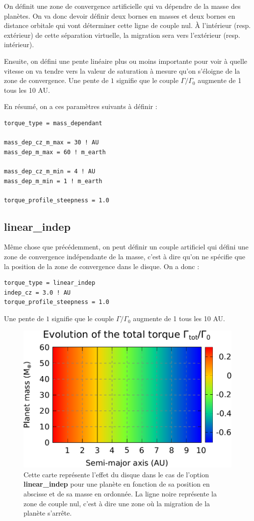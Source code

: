 On définit une zone de convergence artificielle qui va dépendre de la masse des planètes. On va donc devoir définir deux bornes en masses et deux bornes en distance orbitale qui vont déterminer cette ligne de couple nul. À l'intérieur (resp. extérieur) de cette séparation virtuelle, la migration sera vers l'extérieur (resp. intérieur).

Ensuite, on défini une pente linéaire plus ou moins importante pour voir à quelle vitesse on va tendre vers la valeur de saturation à mesure qu'on s'éloigne de la zone de convergence. Une pente de $1$ signifie que le couple $\Gamma/\Gamma_0$ augmente de 1 tous les 10 AU.

En résumé, on a ces paramètres suivants à définir : 
\begin{verbatim}
torque_type = mass_dependant

mass_dep_cz_m_max = 30 ! AU
mass_dep_m_max = 60 ! m_earth

mass_dep_cz_m_min = 4 ! AU
mass_dep_m_min = 1 ! m_earth

torque_profile_steepness = 1.0
\end{verbatim}

\subsection{linear\_indep}\label{sec:linear_indep}
Même chose que précédemment, on peut définir un couple artificiel qui défini une zone de convergence indépendante de la masse, c'est à dire qu'on ne spécifie que la position de la zone de convergence dans le disque. On a donc : 
\begin{verbatim}
torque_type = linear_indep
indep_cz = 3.0 ! AU
torque_profile_steepness = 1.0
\end{verbatim}

Une pente de $1$ signifie que le couple $\Gamma/\Gamma_0$ augmente de 1 tous les 10 AU.

\begin{figure}[htb]
\centering
\includegraphics[width=0.65\linewidth]{figure/migration_map/linear_indep.pdf}
\caption{Cette carte représente l'effet du disque dans le cas de l'option \textbf{linear\_indep} pour une planète en fonction de sa position en abscisse et de sa masse en ordonnée. La ligne noire représente la zone de couple nul, c'est à dire une zone où la migration de la planète s'arrête.}
\end{figure}


